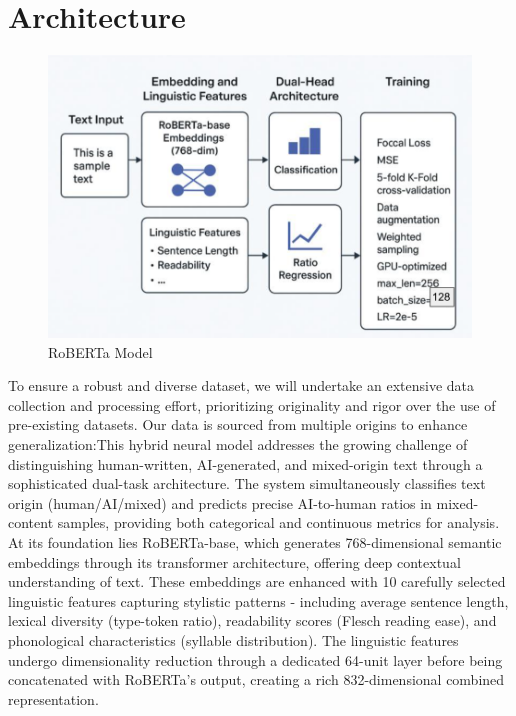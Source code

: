 \documentclass{article} %
\begin{document}
\section{Architecture}
\begin{figure}[htbp]
    \centering
    \includegraphics[width=0.9\linewidth]{architecture.png}
    \caption{RoBERTa Model} 
    \label{fig:pipeline}
\end{figure}
To ensure a robust and diverse dataset, we will undertake an extensive data collection and processing effort, prioritizing originality and rigor over the use of pre-existing datasets. Our data is sourced from multiple origins to enhance generalization:This hybrid neural model addresses the growing challenge of distinguishing human-written, AI-generated, and mixed-origin text through a sophisticated dual-task architecture. The system simultaneously classifies text origin (human/AI/mixed) and predicts precise AI-to-human ratios in mixed-content samples, providing both categorical and continuous metrics for analysis. At its foundation lies RoBERTa-base, which generates 768-dimensional semantic embeddings through its transformer architecture, offering deep contextual understanding of text. These embeddings are enhanced with 10 carefully selected linguistic features capturing stylistic patterns - including average sentence length, lexical diversity (type-token ratio), readability scores (Flesch reading ease), and phonological characteristics (syllable distribution). The linguistic features undergo dimensionality reduction through a dedicated 64-unit layer before being concatenated with RoBERTa's output, creating a rich 832-dimensional combined representation.\\
\end{document}
